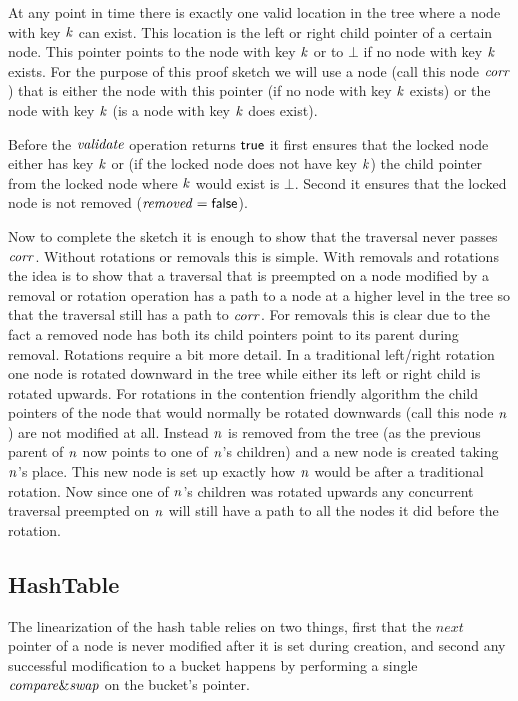 At any point in time there is exactly one valid location in the tree where a node with key $\ms{k}$ can exist.
This location is the left or right child pointer of a certain node.
This pointer points to the node with key $\ms{k}$ or to $\bot$ if no node with key $\ms{k}$ exists.
For the purpose of this proof sketch we will use a node (call this node $\ms{corr}$) that is either the node with
this pointer (if no node with key $\ms{k}$ exists) or the node with key $\ms{k}$ (is a node with key $\ms{k}$ does exist).

Before the $\ms{validate}$ operation returns $\lit{true}$ it first ensures that the locked node either has key $\ms{k}$ or
(if the locked node does not have key $\ms{k}$) the
child pointer from the locked node where $\ms{k}$ would exist is $\bot$.
Second it ensures that the locked node is not removed ($\ms{removed}=\lit{false}$).

Now to complete the sketch it is enough to show that the traversal never passes $\ms{corr}$.
Without rotations or removals this is simple.
With removals and rotations the idea is to show that a traversal that is preempted on a node modified by a removal or rotation
operation has a path to a node at a higher level in the tree so that the traversal still has a path to $\ms{corr}$.
For removals this is clear due to the fact a removed node has both its child pointers point to its parent during removal.
Rotations require a bit more detail.
In a traditional left/right rotation one node is rotated downward in the tree while either its left or
right child is rotated upwards.
For rotations in the contention friendly algorithm the child pointers of the node that
would normally be rotated downwards (call this node $\ms{n}$) are not modified at all.
Instead $\ms{n}$ is removed from the tree (as the previous parent of $\ms{n}$ now points to one of $\ms{n}$'s children)
and a new node is created taking $\ms{n}$'s place.
This new node is set up exactly how $\ms{n}$ would be after a traditional rotation.
Now since one of $\ms{n}$'s children was rotated upwards any concurrent traversal preempted on $\ms{n}$ will
still have a path to all the nodes it did before the rotation.

\subsection{HashTable}
The linearization of the hash table relies on two things, first that the $next$ pointer of a node is never modified
after it is set during creation, and second any successful modification to a bucket happens by performing a
single $\ms{compare\&swap}$ on the bucket's pointer.

